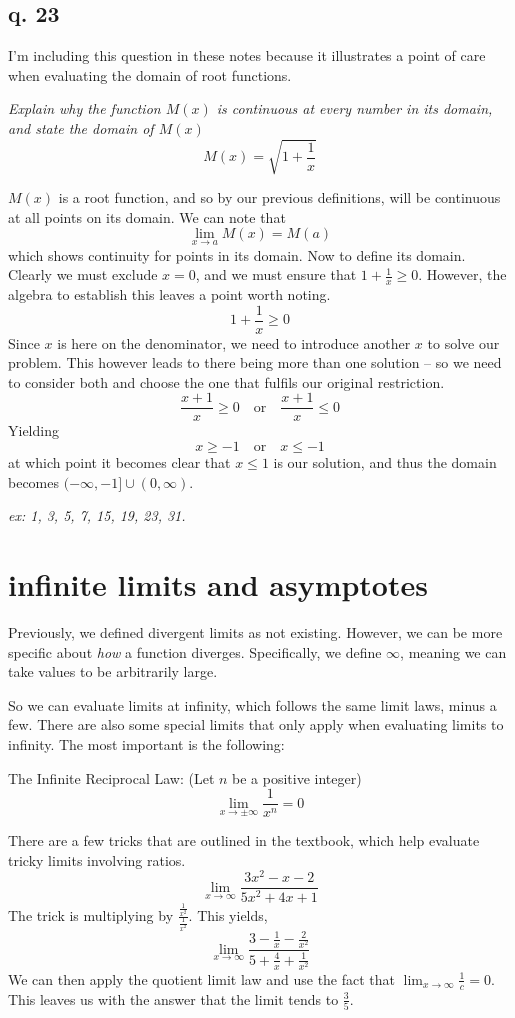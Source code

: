\documentclass[10pt,a4paper]{report}
\begin{document}
\subsection{q. 23}

I'm including this question in these notes because it illustrates a point of care when evaluating the domain of root functions.

\emph{Explain why the function $M(x)$ is continuous at every number in its domain, and state the domain of $M(x)$}
$$
	M(x) = \sqrt{1 + \frac{1}{x}}
$$

$M(x)$ is a root function, and so by our previous definitions, will be continuous at all points on its domain. We can note that
$$
	\lim_{x \to a} M(x) = M(a)
$$
which shows continuity for points in its domain. Now to define its domain. Clearly we must exclude $x = 0$, and we must ensure that $1 + \frac{1}{x} \geq 0$. However, the algebra to establish this leaves a point worth noting.
$$
	1 + \frac{1}{x} \geq 0
$$
Since $x$ is here on the denominator, we need to introduce another $x$ to solve our problem. This however leads to there being more than one solution -- so we need to consider both and choose the one that fulfils our original restriction.
$$
	\frac{x + 1}{x} \geq 0 \quad \text{or} \quad
	\frac{x + 1}{x} \leq 0
$$
Yielding
$$
	x \geq -1 \quad \text{or} \quad x \leq -1
$$
at which point it becomes clear that $x \leq 1$ is our solution, and thus the domain becomes $(-\infty, -1] \cup (0, \infty)$.

\emph{ex: 1, 3, 5, 7, 15, 19, 23, 31.}

\section{infinite limits and asymptotes}

Previously, we defined divergent limits as not existing. However, we can be more specific about \emph{how} a function diverges.
Specifically, we define $\infty$, meaning we can take values to be arbitrarily large.

So we can evaluate limits at infinity, which follows the same limit laws, minus a few. There are also some special limits that only apply when evaluating limits to infinity. The most important is the following:

The Infinite Reciprocal Law: (Let $n$ be a positive integer)
$$
	\lim_{x \to \pm \infty} \frac{1}{x^n} = 0
$$

There are a few tricks that are outlined in the textbook, which help evaluate tricky limits involving ratios.
$$
	\lim_{x \to \infty} \frac{3x^2 - x - 2}{5x^2 + 4x + 1}
$$
The trick is multiplying by $\frac{ \frac{1}{x^2} }{ \frac{1}{x^2} }$. This yields,
$$
	\lim_{x \to \infty} \frac{3 - \frac{1}{x} - \frac{2}{x^2}}{5 + \frac{4}{x} + \frac{1}{x^2}}
$$
We can then apply the quotient limit law and use the fact that $\lim_{x \to \infty} \frac{1}{c} = 0$. This leaves us with the answer that the limit tends to $\frac{3}{5}$.
\end{document}
